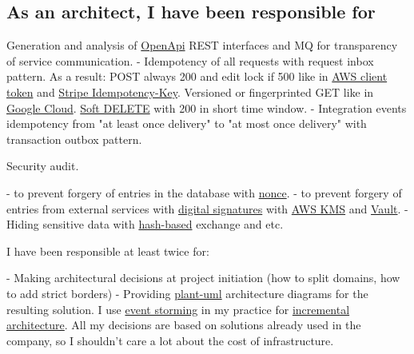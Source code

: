 \documentclass{yb}
\begin{document}
\begin{samepage}

\subsection*{As an architect, I have been responsible for}

Generation and analysis of \href{https://www.openapis.org/}{OpenApi} REST interfaces and MQ for transparency of service communication.
\newline - Idempotency of all requests with request inbox pattern. As a result: POST always 200 and edit lock if 500 like in \href{https://docs.aws.amazon.com/AWSEC2/latest/APIReference/Run_Instance_Idempotency.html#client-tokens}{AWS client token} and \href{https://stripe.com/docs/api/idempotent_requests}{Stripe Idempotency-Key}. Versioned or fingerprinted GET like in \href{https://cloud.google.com/compute/docs/reference/rest/v1/instances/setTags}{Google Cloud}. \href{https://stackoverflow.com/questions/2549839/are-soft-deletes-a-good-idea}{Soft DELETE} with 200 in short time window.
\newline - Integration events idempotency from "at least once delivery" to "at most once delivery" with transaction outbox pattern.

Security audit.

 - to prevent forgery of entries in the database with \href{https://ethereum.stackexchange.com/questions/27432/what-is-nonce-in-ethereum-how-does-it-prevent-double-spending}{nonce}.
\newline - to prevent forgery of entries from external services with \href{https://cloud.google.com/kms/docs/digital-signatures}{digital signatures} with \href{https://aws.amazon.com/ru/blogs/security/digital-signing-asymmetric-keys-aws-kms/}{AWS KMS} and \href{https://www.vaultproject.io/}{Vault}.
\newline - Hiding sensitive data with \href{https://www.pragmaticcoders.com/blog/anonymous-transactions-on-the-public-blockchain}{hash-based} exchange and etc.

I have been responsible at least twice for:

 - Making architectural decisions at project initiation (how to split domains, how to add strict borders) 
\newline - Providing \href{https://plantuml.com/ru/}{plant-uml} architecture diagrams for the resulting solution. I use \href{https://www.eventstorming.com/}{event storming} in my practice for \href{https://pubs.opengroup.org/architecture/o-aa-standard/_open_agile_architecture.html}{incremental architecture}. All my decisions are based on solutions already used in the company, so I shouldn't care a lot about the cost of infrastructure.


\end{samepage}
\end{document}
